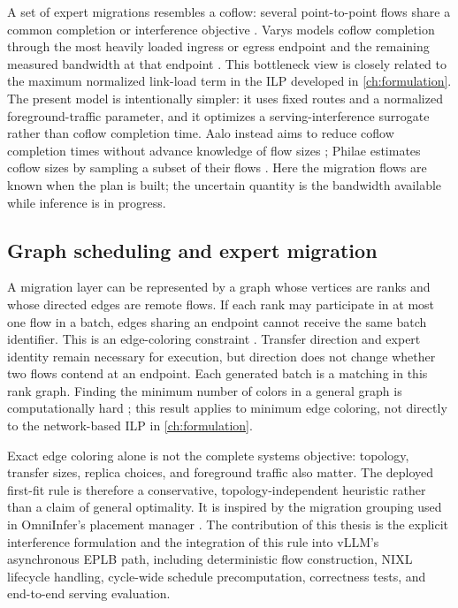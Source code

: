 A set of expert migrations resembles a coflow: several point-to-point flows
share a common completion or interference objective
\cite{chowdhury2012coflow}. Varys models coflow
completion through the most heavily loaded ingress or egress endpoint and the
remaining measured bandwidth at that endpoint \cite{chowdhury2014varys}. This
bottleneck view is closely related to the maximum normalized link-load term in
the ILP developed in \cref{ch:formulation}. The present model is intentionally
simpler: it uses fixed routes and a normalized foreground-traffic parameter,
and it optimizes a serving-interference surrogate rather than coflow
completion time. Aalo instead aims to reduce coflow completion times
without advance knowledge of flow sizes \cite{chowdhury2015aalo}; Philae
estimates coflow sizes by sampling a subset of their flows
\cite{jajoo2019philae}. Here the
migration flows are known when the plan is built; the uncertain quantity is
the bandwidth available while inference is in progress.

\subsection{Graph scheduling and expert migration}

A migration layer can be represented by a graph whose vertices are ranks and
whose directed edges are remote flows. If each rank may participate in at most
one flow in a batch, edges sharing an endpoint cannot receive the same batch
identifier. This is an edge-coloring constraint \cite{west2001graph}. Transfer
direction and expert identity remain necessary for execution, but direction
does not change whether two flows contend at an endpoint. Each generated batch
is a matching in this rank graph. Finding the minimum number of colors
in a general graph is computationally hard \cite{holyer1981edge}; this
result applies to minimum edge coloring, not directly to the network-based
ILP in \cref{ch:formulation}.

Exact edge coloring alone is not the complete systems objective: topology,
transfer sizes, replica choices, and foreground traffic also matter. The
deployed first-fit rule is therefore a conservative, topology-independent
heuristic rather than a claim of general optimality. It is inspired by the
migration grouping used in OmniInfer's placement manager
\cite{omniinferplacement}. The contribution of this thesis is the explicit
interference formulation and the integration of this rule into vLLM's
asynchronous EPLB path, including deterministic flow construction, NIXL
lifecycle handling, cycle-wide schedule precomputation, correctness tests,
and end-to-end serving evaluation.

